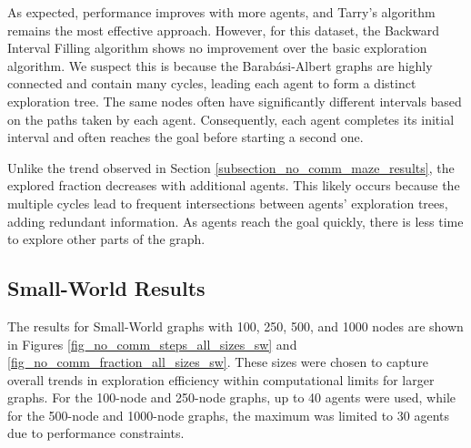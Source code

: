 As expected, performance improves with more agents, and Tarry's algorithm remains the most effective approach. However, for this dataset, the Backward Interval Filling algorithm shows no improvement over the basic exploration algorithm. We suspect this is because the Barabási-Albert graphs are highly connected and contain many cycles, leading each agent to form a distinct exploration tree. The same nodes often have significantly different intervals based on the paths taken by each agent. Consequently, each agent completes its initial interval and often reaches the goal before starting a second one.

Unlike the trend observed in Section \ref{subsection_no_comm_maze_results}, the explored fraction decreases with additional agents. This likely occurs because the multiple cycles lead to frequent intersections between agents' exploration trees, adding redundant information. As agents reach the goal quickly, there is less time to explore other parts of the graph.

\subsection{Small-World Results} 
\label{subsection_no_comm_sw_results}

The results for Small-World graphs with 100, 250, 500, and 1000 nodes are shown in Figures \ref{fig_no_comm_steps_all_sizes_sw} and \ref{fig_no_comm_fraction_all_sizes_sw}. These sizes were chosen to capture overall trends in exploration efficiency within computational limits for larger graphs. For the 100-node and 250-node graphs, up to 40 agents were used, while for the 500-node and 1000-node graphs, the maximum was limited to 30 agents due to performance constraints.

